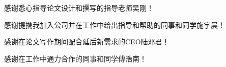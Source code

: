 \begin{thanks}

  感谢悉心指导论文设计和撰写的指导老师吴刚！

  感谢提携我加入公司并在工作中给出指导和帮助的同事和同学施宇晨！

  感谢在论文写作期间配合延后新需求的CEO陆邓君！

  感谢在工作中通力合作的同事和同学傅浩南！

\end{thanks}
